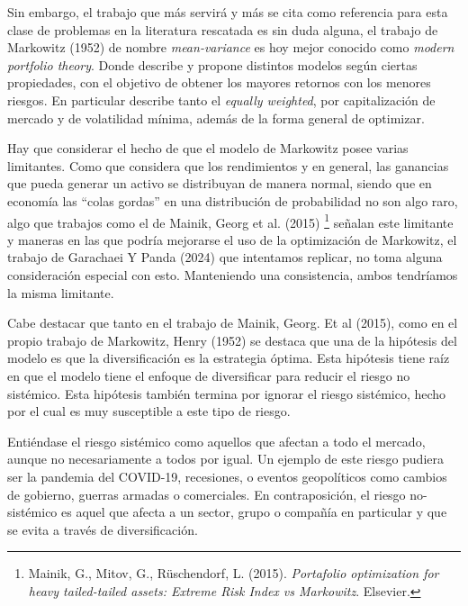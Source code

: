 \documentclass[
]{article}
\begin{document}
Sin embargo, el trabajo que más servirá y más se cita como referencia
para esta clase de problemas en la literatura rescatada es sin duda
alguna, el trabajo de Markowitz (1952) de nombre \emph{mean-variance}
es hoy mejor conocido como \emph{modern portfolio theory}. Donde
describe y propone distintos modelos según ciertas propiedades, con el
objetivo de obtener los mayores retornos con los menores riesgos. En
particular describe tanto el \emph{equally weighted}, por capitalización
de mercado y de volatilidad mínima, además de la forma general de optimizar.

Hay que considerar el hecho de que el modelo de Markowitz posee varias limitantes.
Como que considera que los rendimientos y en general, las ganancias que pueda
generar un activo se distribuyan de manera normal, siendo que en economía las
``colas gordas'' en una distribución de probabilidad no son algo raro, algo que
trabajos como el de Mainik, Georg et al. (2015) \footnote{Mainik, G., Mitov, G., Rüschendorf, L. (2015). 
\emph{Portafolio optimization for heavy tailed-tailed assets: Extreme Risk Index vs Markowitz}. Elsevier.} 
señalan este limitante y maneras en las que podría mejorarse el uso de la optimización de Markowitz, 
el trabajo de Garachaei Y Panda (2024) que intentamos replicar, no toma alguna 
consideración especial con esto. Manteniendo una consistencia, ambos tendríamos 
la misma limitante.

Cabe destacar que tanto en el trabajo de Mainik, Georg. Et al (2015), como en el
propio trabajo de Markowitz, Henry (1952) se destaca que una de la hipótesis del
modelo es que la diversificación es la estrategia óptima. Esta hipótesis tiene raíz en
que el modelo tiene el enfoque de diversificar para reducir el riesgo no sistémico.
Esta hipótesis también termina por ignorar el riesgo sistémico, hecho por el cual es
muy susceptible a este tipo de riesgo. 

Entiéndase el riesgo sistémico como aquellos que afectan a todo el mercado,
aunque no necesariamente a todos por igual. Un ejemplo de este riesgo pudiera ser
la pandemia del COVID-19, recesiones, o eventos geopolíticos como cambios de
gobierno, guerras armadas o comerciales. En contraposición, el riesgo no-sistémico
es aquel que afecta a un sector, grupo o compañía en particular y que se evita a
través de diversificación.
\end{document}
